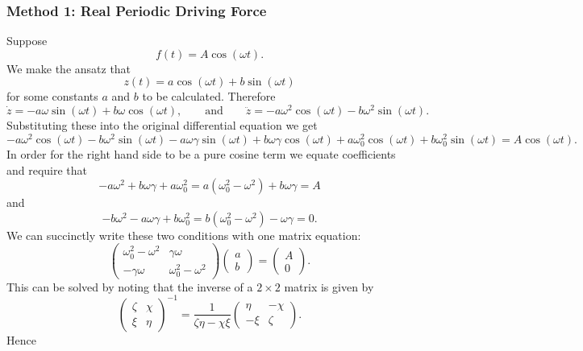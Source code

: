 \documentclass[a4paper]{article}
\begin{document}
    \subsubsection{Method 1: Real Periodic Driving Force}
    Suppose
    \[f(t) = A\cos(\omega t).\]
    We make the ansatz that
    \[z(t) = a\cos(\omega t) + b\sin(\omega t)\]
    for some constants \(a\) and \(b\) to be calculated.
    Therefore
    \[\dot{z} = -a\omega\sin(\omega t) + b\omega\cos(\omega t), \qquad\text{and}\qquad \ddot{z} = -a\omega^2\cos(\omega t) - b\omega^2\sin(\omega t).\]
    Substituting these into the original differential equation we get
    \[-a\omega^2\cos(\omega t) - b\omega^2\sin(\omega t) - a\omega\gamma\sin(\omega t) + b\omega\gamma\cos(\omega t) + a\omega_0^2\cos(\omega t) + b\omega_0^2\sin(\omega t) = A\cos(\omega t).\]
    In order for the right hand side to be a pure cosine term we equate coefficients and require that
    \[-a\omega^2 + b\omega\gamma + a\omega_0^2 = a(\omega_0^2 - \omega^2) + b\omega\gamma = A\]
    and
    \[-b\omega^2 - a\omega\gamma + b\omega_0^2 = b(\omega_0^2 - \omega^2) -\omega\gamma = 0.\]
    We can succinctly write these two conditions with one matrix equation:
    \[
        \begin{pmatrix}
            \omega_0^2 - \omega^2 & \gamma\omega\\
            -\gamma\omega & \omega_0^2 - \omega^2
        \end{pmatrix}
        \begin{pmatrix}
            a\\ b
        \end{pmatrix}
        =
        \begin{pmatrix}
            A\\ 0
        \end{pmatrix}
        .
    \]
    This can be solved by noting that the inverse of a \(2\times 2\) matrix is given by
    \[
        \begin{pmatrix}
            \zeta & \chi\\
            \xi & \eta
        \end{pmatrix}
        ^{-1} =
        \frac{1}{\zeta\eta - \chi\xi}
        \begin{pmatrix}
            \eta & -\chi\\
            -\xi & \zeta
        \end{pmatrix}
        .
    \]
    Hence
\end{document}

